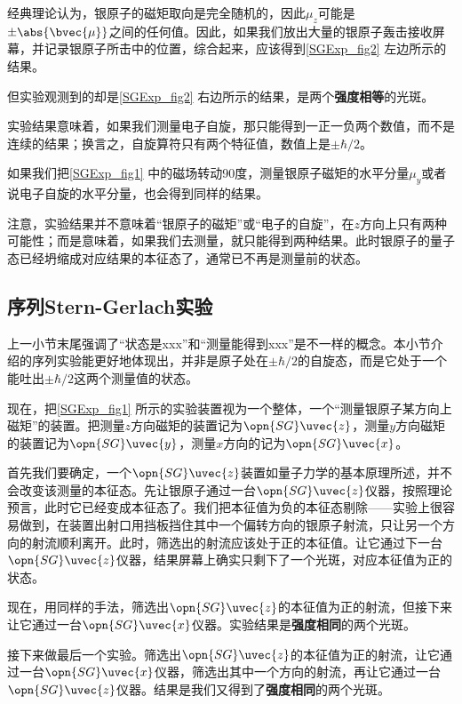 经典理论认为，银原子的磁矩取向是完全随机的，因此$\mu_z$可能是$\pm\abs{\bvec{\mu}}$之间的任何值。因此，如果我们放出大量的银原子轰击接收屏幕，并记录银原子所击中的位置，综合起来，应该得到\autoref{SGExp_fig2} 左边所示的结果。

但实验观测到的却是\autoref{SGExp_fig2} 右边所示的结果，是两个\textbf{强度相等}的光斑。


实验结果意味着，如果我们测量电子自旋，那只能得到一正一负两个数值，而不是连续的结果；换言之，自旋算符只有两个特征值，数值上是$\pm\hbar/2$。


如果我们把\autoref{SGExp_fig1} 中的磁场转动90度，测量银原子磁矩的水平分量$\mu_y$或者说电子自旋的水平分量，也会得到同样的结果。



注意，实验结果并不意味着“银原子的磁矩”或“电子的自旋”，在$z$方向上只有两种可能性；而是意味着，如果我们去测量，就只能得到两种结果。此时银原子的量子态已经坍缩成对应结果的本征态了，通常已不再是测量前的状态。



\subsection{序列Stern-Gerlach实验}\label{SGExp_sub1}

上一小节末尾强调了“状态是xxx”和“测量能得到xxx”是不一样的概念。本小节介绍的序列实验能更好地体现出，并非是原子处在$\pm\hbar/2$的自旋态，而是它处于一个能吐出$\pm\hbar/2$这两个测量值的状态。

现在，把\autoref{SGExp_fig1} 所示的实验装置视为一个整体，一个“测量银原子某方向上磁矩”的装置。把测量$z$方向磁矩的装置记为$\opn{SG}\uvec{z}$，测量$y$方向磁矩的装置记为$\opn{SG}\uvec{y}$，测量$x$方向的记为$\opn{SG}\uvec{x}$。

首先我们要确定，一个$\opn{SG}\uvec{z}$装置如量子力学的基本原理所述，并不会改变该测量的本征态。先让银原子通过一台$\opn{SG}\uvec{z}$仪器，按照理论预言，此时它已经变成本征态了。我们把本征值为负的本征态剔除——实验上很容易做到，在装置出射口用挡板挡住其中一个偏转方向的银原子射流，只让另一个方向的射流顺利离开。此时，筛选出的射流应该处于正的本征值。让它通过下一台$\opn{SG}\uvec{z}$仪器，结果屏幕上确实只剩下了一个光斑，对应本征值为正的状态。

现在，用同样的手法，筛选出$\opn{SG}\uvec{z}$的本征值为正的射流，但接下来让它通过一台$\opn{SG}\uvec{x}$仪器。实验结果是\textbf{强度相同}的两个光斑。

接下来做最后一个实验。筛选出$\opn{SG}\uvec{z}$的本征值为正的射流，让它通过一台$\opn{SG}\uvec{x}$仪器，筛选出其中一个方向的射流，再让它通过一台$\opn{SG}\uvec{z}$仪器。结果是我们又得到了\textbf{强度相同}的两个光斑。



